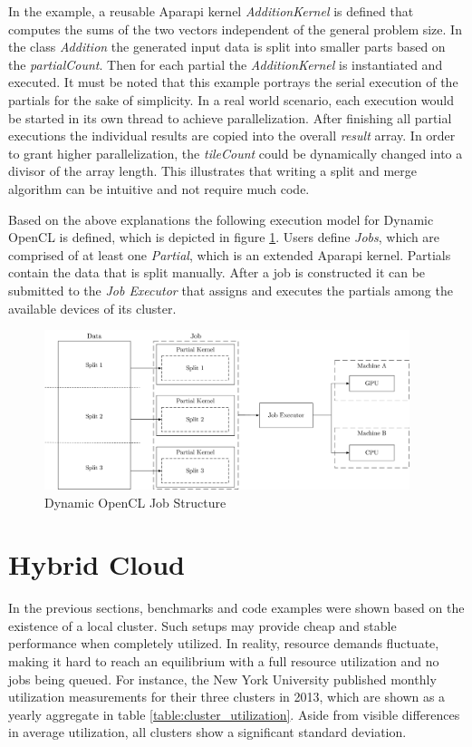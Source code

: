 In the example, a reusable Aparapi kernel \textit{AdditionKernel} is defined that computes the sums of the two vectors independent of the general problem size. In the class \textit{Addition} the generated input data is split into smaller parts based on the \textit{partialCount}. Then for each partial the \textit{AdditionKernel} is instantiated and executed. It must be noted that this example portrays the serial execution of the partials for the sake of simplicity. In a real world scenario, each execution would be started in its own thread to achieve parallelization. After finishing all partial executions the individual results are copied into the overall \textit{result} array. In order to grant higher parallelization, the \textit{tileCount} could be dynamically changed into a divisor of the array length. This illustrates that writing a split and merge algorithm can be intuitive and not require much code.

Based on the above explanations the following execution model for Dynamic OpenCL is defined, which is depicted in figure \ref{img:dynamic_opencl_job}. Users define \textit{Jobs}, which are comprised of at least one \textit{Partial}, which is an extended Aparapi kernel. Partials contain the data that is split manually. After a job is constructed it can be submitted to the \textit{Job Executor} that assigns and executes the partials among the available devices of its cluster.

\begin{figure}[H]
	\includegraphics[width=0.95\textwidth]{drawings/dynamic_opencl_job.pdf}
	\centering
	\caption{Dynamic OpenCL Job Structure}
	\label{img:dynamic_opencl_job}
\end{figure}


\section{Hybrid Cloud}
\label{main_hybrid_cloud}
In the previous sections, benchmarks and code examples were shown based on the existence of a local cluster. Such setups may provide cheap and stable performance when completely utilized. In reality, resource demands fluctuate, making it hard to reach an equilibrium with a full resource utilization and no jobs being queued. For instance, the New York University published monthly utilization measurements for their three clusters in 2013\cite{nyu}, which are shown as a yearly aggregate in table \ref{table:cluster_utilization}. Aside from visible differences in average utilization, all clusters show a significant standard deviation.

